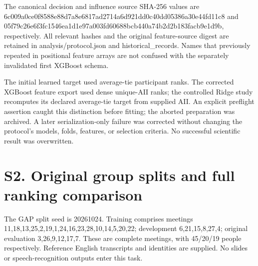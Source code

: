 \documentclass[journal,onecolumn]{IEEEtran}
\begin{document}
The canonical decision and influence source SHA-256 values are 6c009a0c\allowbreak{}e0f8588e\allowbreak{}88d7a8e6\allowbreak{}817ad271\allowbreak{}4a6d921d\allowbreak{}d0c40dd0\allowbreak{}5386a30e\allowbreak{}44fd11c8 and 05f79c26\allowbreak{}e6f3fc15\allowbreak{}46ea1d1e\allowbreak{}97a003fd\allowbreak{}60688bcb\allowbreak{}440a74b2\allowbreak{}d2b183fa\allowbreak{}cb9e1d9b, respectively. All relevant hashes and the original feature-source digest are retained in analysis/protocol.json and historical\_\allowbreak{}records. Names that previously repeated in positional feature arrays are not confused with the separately invalidated first XGBoost schema.

The initial learned target used average-tie participant ranks. The corrected XGBoost feature export used dense unique-AII ranks; the controlled Ridge study recomputes its declared average-tie target from supplied AII. An explicit preflight assertion caught this distinction before fitting; the aborted preparation was archived. A later serialization-only failure was corrected without changing the protocol's models, folds, features, or selection criteria. No successful scientific result was overwritten.

\section*{S2. Original group splits and full ranking comparison}
The GAP split seed is 20261024. Training comprises meetings 11,18,13,25,2,19,1,24,16,23,28,10,14,5,20,22; development 6,21,15,8,27,4; original evaluation 3,26,9,12,17,7. These are complete meetings, with 45/20/19 people respectively. Reference English transcripts and identities are supplied. No slides or speech-recognition outputs enter this task.
\end{document}
